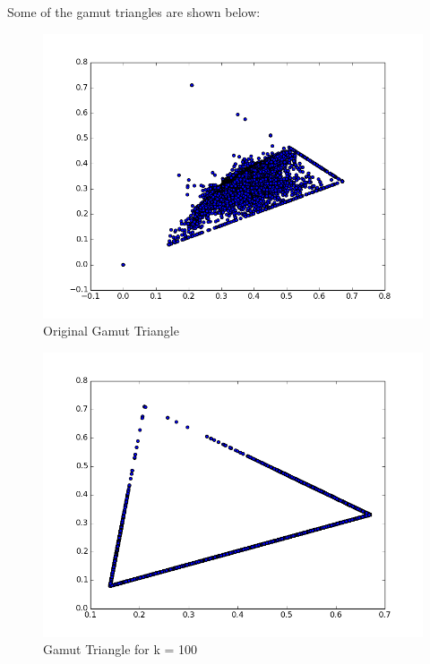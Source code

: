 \documentclass[]{article}
\begin{document}
Some of the gamut triangles are shown below:
\begin{figure}[h!]
  \begin{center}
    \includegraphics[scale=0.4]{gamut_trianglenormal}
    \caption[p1]{Original Gamut Triangle}
  \end{center}
\end{figure}
\begin{figure}[h!]
  \begin{center}
    \includegraphics[scale=0.4]{gamut_triangle_maxsat_normal_100}
    \caption[p1]{Gamut Triangle for k = 100}
  \end{center}
\end{figure}
\end{document}
